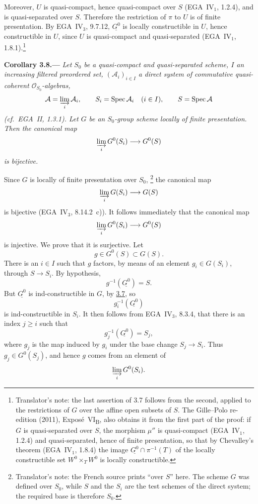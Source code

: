 Moreover, \(U\) is quasi-compact, hence quasi-compact over \(S\)
(EGA~IV\(_1\), 1.2.4), and is quasi-separated over \(S\).
Therefore the restriction of \(\pi\) to \(U\) is of finite
presentation. By EGA~IV\(_3\), 9.7.12, \(\underline{G^0}\) is locally
constructible in \(U\), hence constructible in \(U\), since \(U\)
is quasi-compact and quasi-separated (EGA~IV\(_1\), 1.8.1).\footnote{Translator's note: the last
assertion of 3.7 follows from the second, applied to the restrictions of \(G\) over the affine open
subsets of \(S\). The Gille--Polo re-edition (2011), Expos\'e~VI\textsubscript{B}, also obtains it from the
first part of the proof: if \(G\) is quasi-separated over \(S\), the morphism \(\mu''\) is quasi-compact
(EGA~IV\(_1\), 1.2.4) and quasi-separated, hence of finite presentation, so that by Chevalley's theorem
(EGA~IV\(_1\), 1.8.4) the image \(\underline{G^0}\cap\pi^{-1}(T)\) of the locally constructible set
\(W^0\times_TW^0\) is locally constructible.}

\medskip
{}\label{cor:sga3-VIB-3.8}%
\noindent\textbf{Corollary 3.8.---}
\emph{Let \(S_0\) be a quasi-compact and quasi-separated scheme,
\(I\) an increasing filtered preordered set,
\((\mathcal A_i)_{i\in I}\) a direct system of commutative
quasi-coherent \(\mathcal O_{S_0}\)-algebras,}
\[
  \mathcal A=\varinjlim_i\mathcal A_i,\qquad
  S_i=\operatorname{Spec}\mathcal A_i\quad(i\in I),\qquad
  S=\operatorname{Spec}\mathcal A
\]
\emph{\textup{(cf.\ EGA~II, 1.3.1)}. Let \(G\) be an
\(S_0\)-group scheme locally of finite presentation. Then the
canonical map}
\[
  \varinjlim_i G^0(S_i)\longrightarrow G^0(S)
\]
\emph{is bijective.}

Since \(G\) is locally of finite presentation over \(S_0\),%
\begingroup
\renewcommand{\thefootnote}{\fnsymbol{footnote}}%
\footnote[1]{\label{note:sga3-VIB-3.8-base}Translator's note: the
French source prints ``over \(S\)'' here. The scheme \(G\) was
defined over \(S_0\), while \(S\) and the \(S_i\) are the test
schemes of the direct system; the required base is therefore
\(S_0\).}%
\endgroup{}
the canonical map
\[
  \varinjlim_i G(S_i)\longrightarrow G(S)
\]
is bijective (EGA~IV\(_3\), 8.14.2~c)). It follows immediately
that the canonical map
\[
  \varinjlim_i G^0(S_i)\longrightarrow G^0(S)
\]
is injective. We prove that it is surjective. Let
\[
  g\in G^0(S)\subset G(S).
\]
There is an \(i\in I\) such that \(g\) factors, by means of an
element \(g_i\in G(S_i)\), through \(S\to S_i\). By hypothesis,
\[
  g^{-1}(\underline{G^0})=S.
\]
But \(\underline{G^0}\) is ind-constructible in \(G\), by \hyperref[prop:sga3-VIB-3.7]{3.7}, so
\[
  g_i^{-1}(\underline{G^0})
\]
is ind-constructible in \(S_i\). It then follows from EGA~IV\(_3\),
8.3.4, that there is an index \(j\geq i\) such that
\[
  g_j^{-1}(\underline{G^0})=S_j,
\]
where \(g_j\) is the map induced by \(g_i\) under the base change
\(S_j\to S_i\). Thus \(g_j\in G^0(S_j)\), and hence \(g\) comes
from an element of
\[
  \varinjlim_i G^0(S_i).
\]
